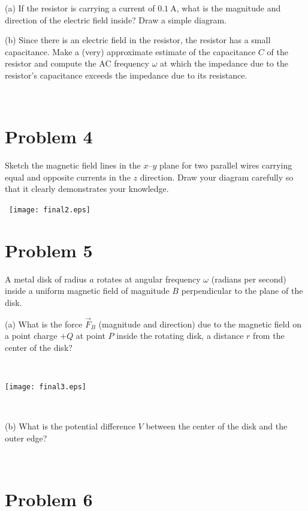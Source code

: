\documentclass[12pt]{article}
\begin{document}
(a) If the resistor is carrying a current of $0.1~\mathrm{A}$, what
is the magnitude and direction of the electric field inside?  Draw a
simple diagram.

\vfill

(b) Since there is an electric field in the resistor, the resistor has
a small capacitance.  Make a (very) approximate estimate of the
capacitance $C$ of the resistor and compute the AC frequency $\omega$
at which the impedance due to the resistor's capacitance exceeds the
impedance due to its resistance.

\vfill ~

\clearpage

\section*{Problem 4}

Sketch the magnetic field lines in the $x$--$y$ plane for two parallel
wires carrying equal and opposite currents in the $z$ direction.  Draw
your diagram carefully so that it clearly demonstrates your knowledge.

\vfill

\noindent~\hfill\texttt{[image: final2.eps]}\hfill~

\clearpage

\section*{Problem 5}

A metal disk of radius $a$ rotates at angular frequency $\omega$
(radians per second) inside a uniform magnetic field of magnitude $B$
perpendicular to the plane of the disk.

(a) What is the force $\vec{F}_B$ (magnitude and direction) due to the
magnetic field on a point charge $+Q$ at point $P$ inside the rotating
disk, a distance $r$ from the center of the disk?

~

\noindent\texttt{[image: final3.eps]}

~

(b) What is the potential difference $V$ between the center of the
disk and the outer edge?

\vfill ~

\clearpage

\section*{Problem 6}
\end{document}
